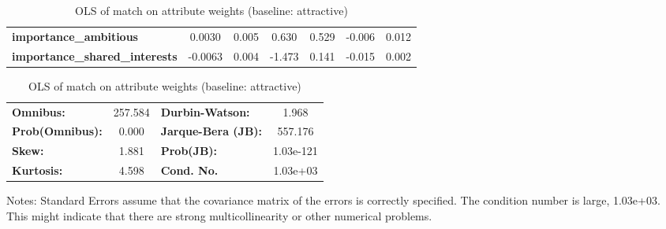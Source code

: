 \begin{table}[htbp]
\begin{center}
\begin{tabular}{lcccccc}
\textbf{importance\_ambitious}         &       0.0030  &        0.005     &     0.630  &         0.529        &       -0.006    &        0.012     \\
\textbf{importance\_shared\_interests} &      -0.0063  &        0.004     &    -1.473  &         0.141        &       -0.015    &        0.002     \\
\bottomrule
\end{tabular}
\begin{tabular}{lclc}
\textbf{Omnibus:}       & 257.584 & \textbf{  Durbin-Watson:     } &     1.968  \\
\textbf{Prob(Omnibus):} &   0.000 & \textbf{  Jarque-Bera (JB):  } &   557.176  \\
\textbf{Skew:}          &   1.881 & \textbf{  Prob(JB):          } & 1.03e-121  \\
\textbf{Kurtosis:}      &   4.598 & \textbf{  Cond. No.          } &  1.03e+03  \\
\bottomrule
\end{tabular}
\end{center}

Notes: \newline
 [1] Standard Errors assume that the covariance matrix of the errors is correctly specified. \newline
 [2] The condition number is large, 1.03e+03. This might indicate that there are \newline
 strong multicollinearity or other numerical problems.
\caption{OLS of match on attribute weights (baseline: attractive)}
\label{tab:q7_ols}
\end{table}
